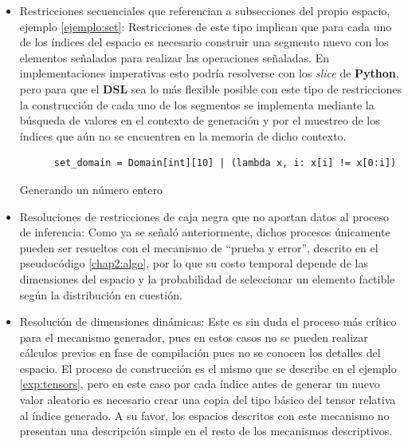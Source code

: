 \begin{itemize}
      \item Restricciones secuenciales que referencian a subsecciones del propio espacio, ejemplo \ref{ejemplo:set}: Restricciones de
            este tipo implican que para cada uno de los índices del espacio es necesario construir una segmento nuevo
            con los elementos señalados para realizar las operaciones señaladas. En implementaciones imperativas esto podría
            resolverse con los {\it slice} de {\bf Python}, pero para que el {\bf DSL} sea lo más flexible posible con este 
            tipo de restricciones la construcción de cada uno de los segmentos se implementa mediante la búsqueda de valores en el 
            contexto de generación y por el muestreo de los índices que aún no se encuentren en la memoria de dicho contexto.   

            \begin{listing}[!ht]
                  \begin{verbatim}
      set_domain = Domain[int][10] | (lambda x, i: x[i] != x[0:i])
                  \end{verbatim}
                  \caption{Generando un número entero}
                  \label{ejemplo:set}
              \end{listing}

      \item Resoluciones de restricciones de caja negra que no aportan datos al proceso de inferencia: Como ya
            se señaló anteriormente, dichos procesos únicamente pueden ser resueltos con el mecanismo de “prueba y error”, descrito en el pseudocódigo \ref{chap2:algo},
            por lo que su costo temporal depende de las dimensiones del espacio y la probabilidad de seleccionar un elemento
            factible según la distribución en cuestión.
      \item Resolución de dimensiones dinámicas: Este es sin duda el proceso más crítico para el mecanismo generador,
            pues en estos casos no se pueden realizar cálculos previos en fase de compilación pues no se conocen los detalles
            del espacio. El proceso de construcción es el mismo que se describe en el ejemplo \ref{exp:tensors}, pero en este caso
            por cada índice antes de generar un nuevo valor aleatorio es necesario crear una copia del tipo básico del tensor relativa al índice generado.
            A su favor, los espacios descritos con este mecanismo no presentan una descripción simple en el resto de los mecanismos descriptivos.
\end{itemize}

